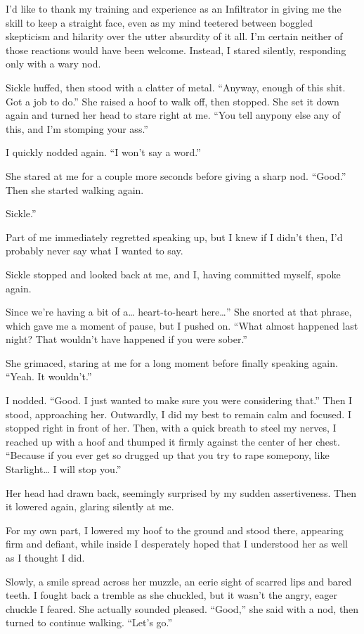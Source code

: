 I’d like to thank my training and experience as an Infiltrator in giving me the skill to keep a straight face, even as my mind teetered between boggled skepticism and hilarity over the utter absurdity of it all. I’m certain neither of those reactions would have been welcome. Instead, I stared silently, responding only with a wary nod.

Sickle huffed, then stood with a clatter of metal. “Anyway, enough of this shit. Got a job to do.” She raised a hoof to walk off, then stopped. She set it down again and turned her head to stare right at me. “You tell anypony else any of this, and I’m stomping your ass.”

I quickly nodded again. “I won’t say a word.”

She stared at me for a couple more seconds before giving a sharp nod. “Good.” Then she started walking again.

\leavevmode{}Sickle.”

Part of me immediately regretted speaking up, but I knew if I didn’t then, I’d probably never say what I wanted to say.

Sickle stopped and looked back at me, and I, having committed myself, spoke again.

\leavevmode{}Since we’re having a bit of a… heart-to-heart here…” She snorted at that phrase, which gave me a moment of pause, but I pushed on. “What almost happened last night? That wouldn’t have happened if you were sober.”

She grimaced, staring at me for a long moment before finally speaking again. “Yeah. It wouldn’t.”

I nodded. “Good. I just wanted to make sure you were considering that.” Then I stood, approaching her. Outwardly, I did my best to remain calm and focused. I stopped right in front of her. Then, with a quick breath to steel my nerves, I reached up with a hoof and thumped it firmly against the center of her chest. “Because if you ever get so drugged up that you try to rape somepony, like Starlight… I will stop you.”

Her head had drawn back, seemingly surprised by my sudden assertiveness. Then it lowered again, glaring silently at me.

For my own part, I lowered my hoof to the ground and stood there, appearing firm and defiant, while inside I desperately hoped that I understood her as well as I thought I did.

Slowly, a smile spread across her muzzle, an eerie sight of scarred lips and bared teeth. I fought back a tremble as she chuckled, but it wasn’t the angry, eager chuckle I feared. She actually sounded pleased. “Good,” she said with a nod, then turned to continue walking. “Let’s go.”

